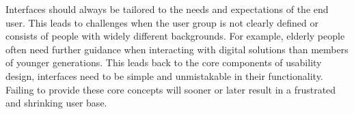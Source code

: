 \blankLine

Interfaces should always be tailored to the needs and expectations of the end user. This leads to challenges when the user group is not clearly defined or consists of people with widely different backgrounds. For example, elderly people often need further guidance when interacting with digital solutions than members of younger generations. This leads back to the core components of usability design, interfaces need to be simple and unmistakable in their functionality. Failing to provide these core concepts will sooner or later result in a frustrated and shrinking user base. 
\autocite{Paul:UIUXIntroduction}